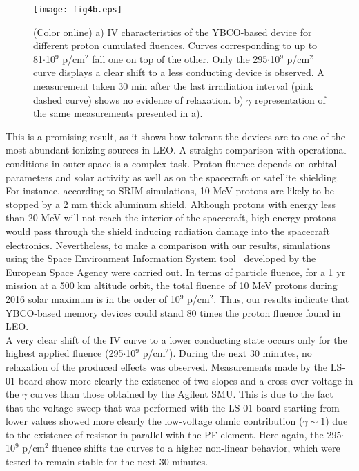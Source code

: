 \documentclass[square,aip,preprint,showkeys,superscriptaddress]{revtex4}
\begin{document}
\begin{figure} [htb]
	\vspace{0mm}
	\centerline{\texttt{[image: fig4b.eps]}}
	\vspace{-1mm}\caption{(Color online) a) IV characteristics of the YBCO-based device for different proton cumulated fluences. Curves corresponding to up to 81$\cdot$10$^9$ p/cm$^2$ fall one on top of the other. Only the 295$\cdot$10$^9$ p/cm$^2$ curve displays a clear shift to a less conducting device is observed. A measurement taken 30 min after the last irradiation interval (pink dashed curve) shows no evidence of relaxation. b) $\gamma$ representation of the same measurements presented in a).} \vspace{-0mm}
	\label{fig:IVexp}
\end{figure}


This is a promising result, as it shows how tolerant the devices are to one of the most abundant ionizing sources in LEO. A straight comparison with operational conditions in outer space is a complex task. Proton fluence depends on orbital parameters and solar activity as well as on the spacecraft or satellite shielding. For instance, according to SRIM simulations, 10 MeV protons are likely to be stopped by a 2 mm thick aluminum shield. Although protons with energy less than 20 MeV will not reach the interior of the spacecraft, high energy protons would pass through the shield inducing radiation damage into the spacecraft electronics. Nevertheless, to make a comparison with our results, simulations using the Space Environment Information System tool~\cite{Spenvis04} developed by the European Space Agency were carried out. In terms of particle fluence, for a 1 yr mission at a 500 km altitude orbit, the total fluence of 10 MeV protons during 2016 solar maximum is in the order of 10$^{9}$ p/cm$^{2}$. Thus, our results indicate that YBCO-based memory devices could stand 80 times the proton fluence found in LEO. \\

A very clear shift of the IV curve to a lower conducting state occurs only for the highest applied fluence (295$\cdot$10$^9$ p/cm$^2$). During the next 30 minutes, no relaxation of the produced effects was observed. Measurements made by the LS-01 board show more clearly the existence of two slopes and a cross-over voltage in the $\gamma$ curves than those obtained by the Agilent SMU. This is due to the fact that the voltage sweep that was performed with the LS-01 board starting from lower values showed more clearly the low-voltage ohmic contribution ($\gamma \sim 1$) due to the existence of resistor in parallel with the PF element. Here again, the 295$\cdot$10$^9$ p/cm$^2$ fluence shifts the curves to a higher non-linear behavior, which were tested to remain stable for the next 30 minutes. \\
\end{document}
